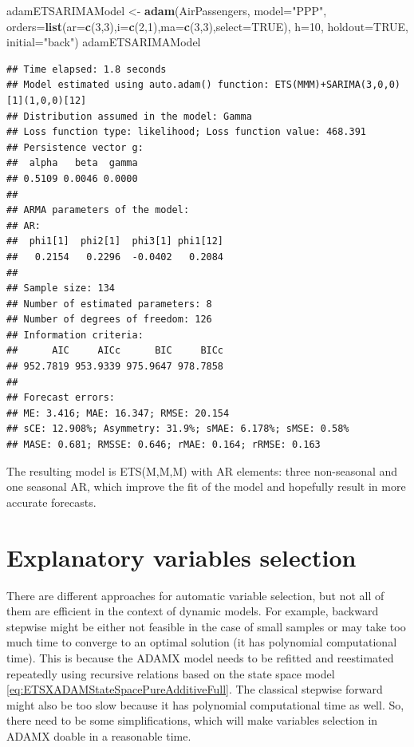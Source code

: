 \documentclass[]{book}
\newenvironment{Shaded}{\begin{snugshade}}{\end{snugshade}}
\newcommand{\DataTypeTok}[1]{\textcolor[rgb]{0.13,0.29,0.53}{#1}}
\newcommand{\DecValTok}[1]{\textcolor[rgb]{0.00,0.00,0.81}{#1}}
\newcommand{\KeywordTok}[1]{\textcolor[rgb]{0.13,0.29,0.53}{\textbf{#1}}}
\newcommand{\NormalTok}[1]{#1}
\newcommand{\OtherTok}[1]{\textcolor[rgb]{0.56,0.35,0.01}{#1}}
\newcommand{\StringTok}[1]{\textcolor[rgb]{0.31,0.60,0.02}{#1}}
\theoremstyle{definition}
\theoremstyle{definition}
\theoremstyle{definition}
\theoremstyle{definition}
\theoremstyle{remark}
\begin{document}
\begin{Shaded}
\begin{Highlighting}[]
\NormalTok{adamETSARIMAModel <-}
\StringTok{    }\KeywordTok{adam}\NormalTok{(AirPassengers, }\DataTypeTok{model=}\StringTok{"PPP"}\NormalTok{,}
         \DataTypeTok{orders=}\KeywordTok{list}\NormalTok{(}\DataTypeTok{ar=}\KeywordTok{c}\NormalTok{(}\DecValTok{3}\NormalTok{,}\DecValTok{3}\NormalTok{),}\DataTypeTok{i=}\KeywordTok{c}\NormalTok{(}\DecValTok{2}\NormalTok{,}\DecValTok{1}\NormalTok{),}\DataTypeTok{ma=}\KeywordTok{c}\NormalTok{(}\DecValTok{3}\NormalTok{,}\DecValTok{3}\NormalTok{),}\DataTypeTok{select=}\OtherTok{TRUE}\NormalTok{),}
         \DataTypeTok{h=}\DecValTok{10}\NormalTok{, }\DataTypeTok{holdout=}\OtherTok{TRUE}\NormalTok{, }\DataTypeTok{initial=}\StringTok{"back"}\NormalTok{)}
\NormalTok{adamETSARIMAModel}
\end{Highlighting}
\end{Shaded}

\begin{verbatim}
## Time elapsed: 1.8 seconds
## Model estimated using auto.adam() function: ETS(MMM)+SARIMA(3,0,0)[1](1,0,0)[12]
## Distribution assumed in the model: Gamma
## Loss function type: likelihood; Loss function value: 468.391
## Persistence vector g:
##  alpha   beta  gamma 
## 0.5109 0.0046 0.0000 
## 
## ARMA parameters of the model:
## AR:
##  phi1[1]  phi2[1]  phi3[1] phi1[12] 
##   0.2154   0.2296  -0.0402   0.2084 
## 
## Sample size: 134
## Number of estimated parameters: 8
## Number of degrees of freedom: 126
## Information criteria:
##      AIC     AICc      BIC     BICc 
## 952.7819 953.9339 975.9647 978.7858 
## 
## Forecast errors:
## ME: 3.416; MAE: 16.347; RMSE: 20.154
## sCE: 12.908%; Asymmetry: 31.9%; sMAE: 6.178%; sMSE: 0.58%
## MASE: 0.681; RMSSE: 0.646; rMAE: 0.164; rRMSE: 0.163
\end{verbatim}

The resulting model is ETS(M,M,M) with AR elements: three non-seasonal and one seasonal AR, which improve the fit of the model and hopefully result in more accurate forecasts.

\hypertarget{ETSXSelection}{%
\section{Explanatory variables selection}\label{ETSXSelection}}

There are different approaches for automatic variable selection, but not all of them are efficient in the context of dynamic models. For example, backward stepwise might be either not feasible in the case of small samples or may take too much time to converge to an optimal solution (it has polynomial computational time). This is because the ADAMX model needs to be refitted and reestimated repeatedly using recursive relations based on the state space model \eqref{eq:ETSXADAMStateSpacePureAdditiveFull}. The classical stepwise forward might also be too slow because it has polynomial computational time as well. So, there need to be some simplifications, which will make variables selection in ADAMX doable in a reasonable time.
\end{document}
